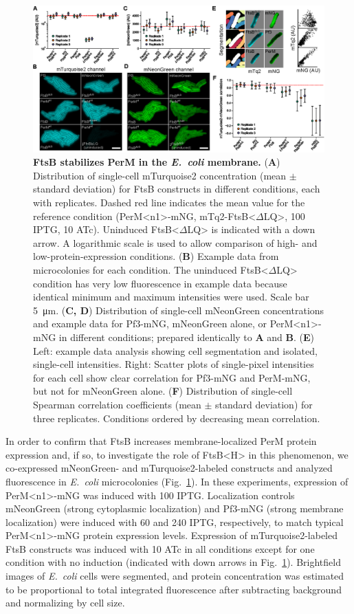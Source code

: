 \documentclass[pdflatex,sn-nature]{sn-jnl}%
\def\textsuperscript#1{<#1>}%
\newcommand\ec{\textit{E.~coli}}
\newcommand\ftsbH{FtsB\textsuperscript{H}}
\newcommand\ftsbdLQ{FtsB\textsuperscript{$\Delta{}$LQ}}
\newcommand\permN{PerM\textsuperscript{n1}}
\begin{document}
\begin{figure}[b]
    \centering
    \includegraphics[width=1.0\textwidth]{./fig4.eps}
    \caption{
        \textbf{FtsB stabilizes PerM in the \ec{} membrane.}
        (\textbf{A}) Distribution of single-cell mTurquoise2 concentration (mean $\pm$ standard deviation) for FtsB constructs in different conditions, each with replicates. Dashed red line indicates the mean value for the reference condition (\permN{}-mNG, mTq2-\ftsbdLQ{}, \qty{100}{\uM} IPTG, \qty{10}{\nM} ATc). Uninduced \ftsbdLQ{} is indicated with a down arrow. A logarithmic scale is used to allow comparison of high- and low-protein-expression conditions.
        (\textbf{B}) Example data from microcolonies for each condition. The uninduced \ftsbdLQ{} condition has very low fluorescence in example data because identical minimum and maximum intensities were used. Scale bar \qty{5}{\um}.
        (\textbf{C, D}) Distribution of single-cell mNeonGreen concentrations and example data for Pf3-mNG, mNeonGreen alone, or \permN{}-mNG in different conditions; prepared identically to \textbf{A} and \textbf{B}.
        (\textbf{E}) Left: example data analysis showing cell segmentation and isolated, single-cell intensities. Right: Scatter plots of single-pixel intensities for each cell show clear correlation for Pf3-mNG and PerM-mNG, but not for mNeonGreen alone. (\textbf{F}) Distribution of single-cell Spearman correlation coefficients (mean $\pm$ standard deviation) for three replicates. Conditions ordered by decreasing mean correlation.
    }\label{fig4}
    \end{figure}

In order to confirm that FtsB increases membrane-localized PerM protein expression and, if so, to investigate the role of \ftsbH{} in this phenomenon, we co-expressed mNeonGreen- and mTurquoise2-labeled constructs and analyzed fluorescence in \ec{} microcolonies (Fig.~\ref{fig4}).
In these experiments, expression of \permN{}-mNG was induced with \qty{100}{\uM} IPTG. Localization controls mNeonGreen (strong cytoplasmic localization) and Pf3-mNG (strong membrane localization) were induced with \qty{60}{\uM} and \qty{240}{\uM} IPTG, respectively, to match typical \permN{}-mNG protein expression levels.
Expression of mTurquoise2-labeled FtsB constructs was induced with \qty{10}{\nM} ATc in all conditions except for one condition with no induction (indicated with down arrows in Fig.~\ref{fig4}).
Brightfield images of \ec{} cells were segmented, and protein concentration was estimated to be proportional to total integrated fluorescence after subtracting background and normalizing by cell size.
\end{document}
